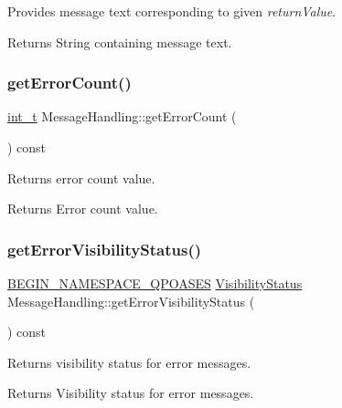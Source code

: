 Provides message text corresponding to given {\itshape return\+Value}. \begin{DoxyReturn}{Returns}
String containing message text. 
\end{DoxyReturn}
\mbox{\label{class_message_handling_a9b0fcad01661054a8de3c5d4c0da2c18}} 
\subsubsection{\texorpdfstring{get\+Error\+Count()}{getErrorCount()}}
{\footnotesize\ttfamily \hyperlink{_types_8hpp_ab6fd6105e64ed14a0c9281326f05e623}{int\+\_\+t} Message\+Handling\+::get\+Error\+Count (\begin{DoxyParamCaption}{ }\end{DoxyParamCaption}) const\hspace{0.3cm}{\ttfamily [inline]}}

Returns error count value. \begin{DoxyReturn}{Returns}
Error count value. 
\end{DoxyReturn}
\mbox{\label{class_message_handling_abc5f45b51ceae367c1bb1f387e6df28b}} 
\subsubsection{\texorpdfstring{get\+Error\+Visibility\+Status()}{getErrorVisibilityStatus()}}
{\footnotesize\ttfamily \hyperlink{_types_8hpp_afd127fcb3c8f47975e9fa0ec2bacde52}{B\+E\+G\+I\+N\+\_\+\+N\+A\+M\+E\+S\+P\+A\+C\+E\+\_\+\+Q\+P\+O\+A\+S\+ES} \hyperlink{_types_8hpp_a36503475bb1fea0a7fd7087259ee63c1}{Visibility\+Status} Message\+Handling\+::get\+Error\+Visibility\+Status (\begin{DoxyParamCaption}{ }\end{DoxyParamCaption}) const\hspace{0.3cm}{\ttfamily [inline]}}

Returns visibility status for error messages. \begin{DoxyReturn}{Returns}
Visibility status for error messages. 
\end{DoxyReturn}
\mbox{\label{class_message_handling_a419e09147087d5999a73dde7ec815beb}} 
